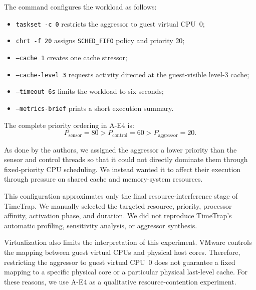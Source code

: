 \noindent The command configures the workload as follows:
\begin{itemize}[nosep]
    \item \texttt{taskset -c 0} restricts the aggressor to guest virtual CPU~0;
    \item \texttt{chrt -f 20} assigns \texttt{SCHED\_FIFO} policy and priority 20;
    \item \texttt{--cache 1} creates one cache stressor;
    \item \texttt{--cache-level 3} requests activity directed at the guest-visible level-3 cache;
    \item \texttt{--timeout 6s} limits the workload to six seconds;
    \item \texttt{--metrics-brief} prints a short execution summary.
\end{itemize}

\noindent The complete priority ordering in A-E4 is:
\begin{equation}
P_{\mathrm{sensor}}=80
>
P_{\mathrm{control}}=60
>
P_{\mathrm{aggressor}}=20.
\end{equation}

\noindent As done by the authors, we assigned the aggressor a lower priority than the sensor and control threads so that it could not directly dominate them through fixed-priority CPU scheduling. We instead wanted it to affect their execution through pressure on shared cache and memory-system resources.

\noindent This configuration approximates only the final resource-interference stage of TimeTrap. We manually selected the targeted resource, priority, processor affinity, activation phase, and duration. We did not reproduce TimeTrap's automatic profiling, sensitivity analysis, or aggressor synthesis.

\noindent Virtualization also limits the interpretation of this experiment. VMware controls the mapping between guest virtual CPUs and physical host cores. Therefore, restricting the aggressor to guest virtual CPU~0 does not guarantee a fixed mapping to a specific physical core or a particular physical last-level cache. For these reasons, we use A-E4 as a qualitative resource-contention experiment. 

